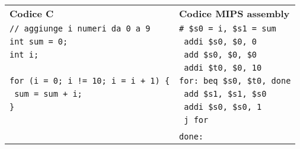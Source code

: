 \documentclass[../main.tex]{subfiles}
\begin{document}
\noindent
\begin{tabular}{ p{9cm} p{9cm} }
    \textbf{Codice C} & \textbf{Codice MIPS assembly} \\
    \texttt{// aggiunge i numeri da 0 a 9} & \texttt{\# \$s0 = i, \$s1 = sum} \\
    \texttt{int sum = 0;} & \texttt{ \hspace*{0cm} \hspace*{0cm} \hspace*{0cm} \hspace*{0cm} \hspace*{0cm} addi \$s0, \$0, 0} \\
    \texttt{int i;} & \texttt{ \hspace*{0cm} \hspace*{0cm} \hspace*{0cm} \hspace*{0cm} \hspace*{0cm} add \$s0, \$0, \$0} \\
    & \texttt{ \hspace*{0cm} \hspace*{0cm} \hspace*{0cm} \hspace*{0cm} \hspace*{0cm} addi \$t0, \$0, 10} \\
    \texttt{for (i = 0; i != 10; i = i + 1) \{} & \texttt{for: beq \$s0, \$t0, done} \\
    \texttt{ \hspace*{0cm} \hspace*{0cm} \hspace*{0cm} sum = sum + i;} & \texttt{ \hspace*{0cm} \hspace*{0cm} \hspace*{0cm} \hspace*{0cm} \hspace*{0cm} add \$s1, \$s1, \$s0} \\
    \texttt{\}} & \texttt{ \hspace*{0cm} \hspace*{0cm} \hspace*{0cm} \hspace*{0cm} \hspace*{0cm} addi \$s0, \$s0, 1} \\
    & \texttt{ \hspace*{0cm} \hspace*{0cm} \hspace*{0cm} \hspace*{0cm} \hspace*{0cm} j for} \\
    \\
    & \texttt{done:} \\
\end{tabular}
\end{document}
